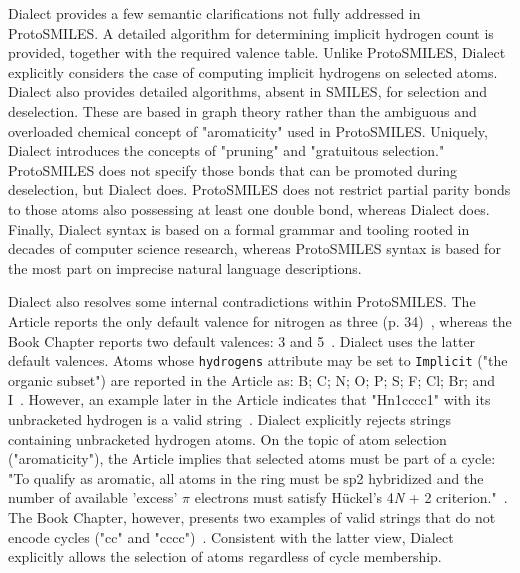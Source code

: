 \documentclass{article}
\def\ttt{\texttt}
\begin{document}
Dialect provides a few semantic clarifications not fully addressed in ProtoSMILES. A detailed algorithm for determining implicit hydrogen count is provided, together with the required valence table. Unlike ProtoSMILES, Dialect explicitly considers the case of computing implicit hydrogens on selected atoms. Dialect also provides detailed algorithms, absent in SMILES, for selection and deselection. These are based in graph theory rather than the ambiguous and overloaded chemical concept of "aromaticity" used in ProtoSMILES. Uniquely, Dialect introduces the concepts of "pruning" and "gratuitous selection." ProtoSMILES does not specify those bonds that can be promoted during deselection, but Dialect does. ProtoSMILES does not restrict partial parity bonds to those atoms also possessing at least one double bond, whereas Dialect does. Finally, Dialect syntax is based on a formal grammar and tooling rooted in decades of computer science research, whereas ProtoSMILES syntax is based for the most part on imprecise natural language descriptions.

Dialect also resolves some internal contradictions within ProtoSMILES. The Article reports the only default valence for nitrogen as three (p. 34)~\cite[p.~34]{weininger:1988}, whereas the Book Chapter reports two default valences: 3 and 5~\cite[p.~84]{weininger:2008}. Dialect uses the latter default valences. Atoms whose \ttt{hydrogens} attribute may be set to \ttt{Implicit} ("the organic subset") are reported in the Article as: B; C; N; O; P; S; F; Cl; Br; and I~\cite[p.~32]{weininger:2008}. However, an example later in the Article indicates that "Hn1cccc1" with its unbracketed hydrogen is a valid string~\cite[p.~35]{weininger:1988}. Dialect explicitly rejects strings containing unbracketed hydrogen atoms. On the topic of atom selection ("aromaticity"), the Article implies that selected atoms must be part of a cycle: "To qualify as aromatic, all atoms in the ring must be sp2 hybridized and the number of available 'excess' $\pi$ electrons must satisfy Hückel's 4{\textit{N}} + 2 criterion."~\cite[p.~34]{weininger:1988}. The Book Chapter, however, presents two examples of valid strings that do not encode cycles ("cc" and "cccc")~\cite[p 85]{weininger:2008}. Consistent with the latter view, Dialect explicitly allows the selection of atoms regardless of cycle membership.
\end{document}
